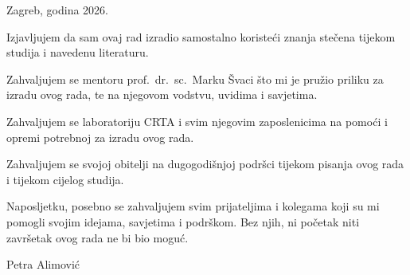 \documentclass[12pt,a4paper,oneside]{report}
\begin{document}
\vfill

\begin{center}
  {\fontsize{14}{17}\selectfont Zagreb, godina 2026.}
\end{center}

\clearpage
\restoregeometry

\pagestyle{empty}
\setlength{\parindent}{0.5cm}

\vspace*{2.2cm}

Izjavljujem da sam ovaj rad izradio samostalno koristeći znanja stečena
tijekom studija i navedenu literaturu.

\vspace{6pt}
Zahvaljujem se mentoru prof.\ dr.\ sc.\ Marku Švaci što mi je pružio
priliku za izradu ovog rada, te na njegovom vodstvu, uvidima i savjetima.

Zahvaljujem se laboratoriju CRTA i svim njegovim zaposlenicima
na pomoći i opremi potrebnoj za izradu ovog rada.

Zahvaljujem se svojoj obitelji na dugogodišnjoj podršci tijekom pisanja ovog rada i tijekom cijelog studija.

Naposljetku, posebno se zahvaljujem svim prijateljima i kolegama koji su mi pomogli svojim idejama, savjetima i podrškom.
Bez njih, ni početak niti završetak ovog rada ne bi bio moguć.

\vspace{1.2cm}
\begin{flushright}
Petra Alimović
\end{flushright}

\setlength{\parindent}{0pt}
\clearpage


\vspace*{\fill}
\begin{center}
\end{center}
\vspace*{\fill}
\clearpage

\pagestyle{fancy}
\setcounter{page}{1}

{}
\tableofcontents
\clearpage
\end{document}
